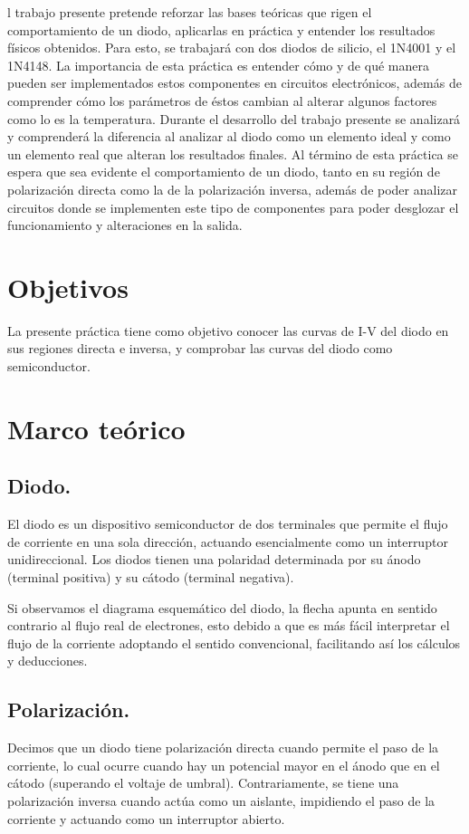 \documentclass[journal]{IEEEtran}
\begin{document}
l trabajo presente pretende reforzar las bases teóricas que rigen el comportamiento de un diodo, aplicarlas en práctica y entender los resultados físicos obtenidos. Para esto, se trabajará con dos diodos de silicio, el 1N4001 y el 1N4148.
La importancia de esta práctica es entender cómo y de qué manera pueden ser implementados estos componentes en circuitos electrónicos, además de comprender cómo los parámetros de éstos cambian al alterar algunos factores como lo es la temperatura.
Durante el desarrollo del trabajo presente se analizará y comprenderá la diferencia al analizar al diodo como un elemento ideal y como un elemento real que alteran los resultados finales.
Al término de esta práctica se espera que sea evidente el comportamiento de un diodo, tanto en su región de polarización directa como la de la polarización inversa, además de poder analizar circuitos donde se implementen este tipo de componentes para poder 
desglozar el funcionamiento y alteraciones en la salida.

\section{Objetivos}
La presente práctica tiene como objetivo conocer las curvas de I-V del diodo en sus regiones directa e inversa, y comprobar las curvas del diodo como semiconductor.
\section{Marco teórico}
\subsection{Diodo.} 
El diodo es un dispositivo semiconductor de dos terminales que permite el flujo de corriente en una sola dirección, actuando esencialmente como un interruptor unidireccional. Los diodos tienen una polaridad determinada por su ánodo (terminal positiva) y su cátodo (terminal negativa).

Si observamos el diagrama esquemático del diodo, la flecha apunta en sentido contrario al flujo real de electrones, esto debido a que es más fácil interpretar el flujo de la corriente adoptando el sentido convencional, facilitando así los cálculos y deducciones.

\subsection{Polarización.}
Decimos que un diodo tiene polarización directa cuando permite el paso de la corriente, lo cual ocurre cuando hay un potencial mayor en el ánodo que en el cátodo (superando el voltaje de umbral). Contrariamente, se tiene una polarización inversa cuando actúa como un aislante, impidiendo el paso de la corriente y actuando como un interruptor abierto. 
\end{document}
